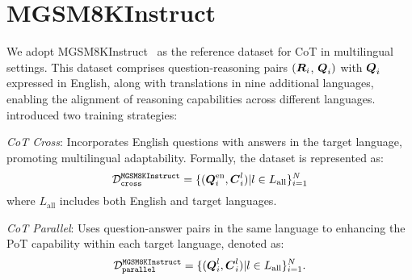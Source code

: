\section{MGSM8KInstruct}
\label{ap:mathoctopus}

We adopt MGSM8KInstruct~\cite{mathoctopus} as the reference dataset for CoT in multilingual settings.
% 
This dataset comprises question-reasoning pairs $(\vb*{R}_i$, $\vb*{Q}_i)$ with $\vb*{Q}_i$ expressed in English, along with translations in nine additional languages, enabling the alignment of reasoning capabilities across different languages.
% 
\citet{mathoctopus} introduced two training strategies:
\begin{inparaenum}[(i)]
    \item \emph{CoT Cross}: Incorporates English questions with answers in the target language, promoting multilingual adaptability. 
    Formally, the dataset is represented as: \begin{equation*}
        \mathcal{D}^\texttt{MGSM8KInstruct}_\texttt{cross} = \{(\vb*{Q}_i^\text{en}, \vb*{C}_i^l)|l\in L_\text{all}\}_{i=1}^N
    \label{eq:d-mathoctopus-cross}
    \end{equation*}
    where $L_\text{all}$ includes both English and target languages.
    \item \emph{CoT Parallel}: Uses question-answer pairs in the same language to 
    enhancing the PoT capability within each target language, denoted as: 
    \begin{equation*}
    \mathcal{D}^\texttt{MGSM8KInstruct}_\texttt{parallel} = \{(\vb*{Q}_i^l, \vb*{C}_i^l)|l\in L_\text{all}\}_{i=1}^N.
    \label{eq:d-mathoctopus-parallel}
    \end{equation*}
\end{inparaenum}
















